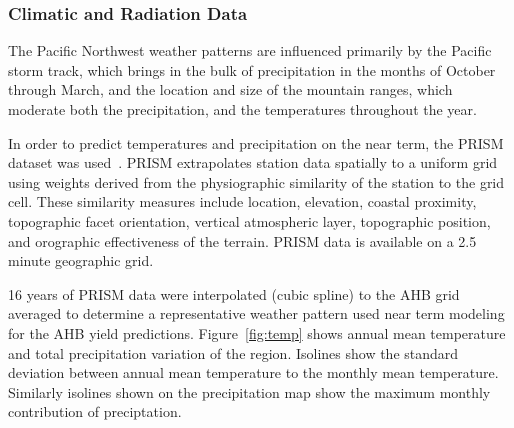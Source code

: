 \documentclass[preprint,12pt]{elsarticle}
\begin{document}
\subsubsection{Climatic and Radiation Data}
\label{sec:climate}


The Pacific Northwest weather patterns are influenced primarily by the
Pacific storm track, which brings in the bulk of precipitation in the
months of October through March, and the location and size of the
mountain ranges, which moderate both the precipitation, and the
temperatures throughout the year.

In order to predict temperatures and precipitation on the near term,
the \acf{PRISM} dataset was used~\cite{Daly2008a}.  \ac{PRISM}
extrapolates station data spatially to a uniform grid using weights
derived from the physiographic similarity of the station to the grid
cell. These similarity measures include location, elevation, coastal
proximity, topographic facet orientation, vertical atmospheric layer,
topographic position, and orographic effectiveness of the terrain.
\ac{PRISM} data is available on a 2.5 minute geographic grid.

16 years of \ac{PRISM} data were interpolated (cubic spline) to the
\ac{AHB} grid averaged to determine a representative weather pattern
used near term modeling for the \ac{AHB} yield predictions.
Figure~\ref{fig:temp} shows annual mean temperature and total
precipitation variation of the region.  Isolines show the standard
deviation between annual mean temperature to the monthly mean
temperature.  Similarly isolines shown on the precipitation map show
the maximum monthly contribution of preciptation.
\end{document}
